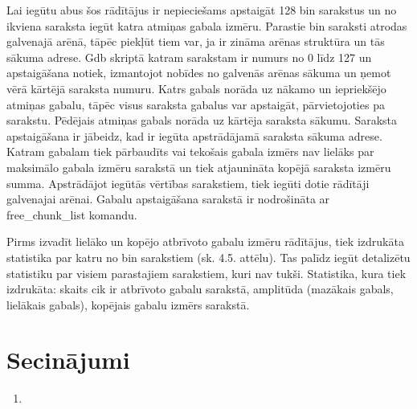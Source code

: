 Lai iegūtu abus šos rādītājus ir nepieciešams apstaigāt 128 bin sarakstus un no ikviena saraksta iegūt katra atmiņas gabala izmēru.
Parastie bin saraksti atrodas galvenajā arēnā, tāpēc piekļūt tiem var, ja ir zināma arēnas struktūra un tās sākuma adrese.
Gdb skriptā katram sarakstam ir numurs no 0 līdz 127 un apstaigāšana notiek, izmantojot nobīdes no galvenās arēnas sākuma un ņemot vērā kārtējā saraksta numuru.
Katrs gabals norāda uz nākamo un iepriekšējo atmiņas gabalu, tāpēc visus saraksta gabalus var apstaigāt, pārvietojoties pa sarakstu.
Pēdējais atmiņas gabals norāda uz kārtēja saraksta sākumu.
Saraksta apstaigāšana ir jābeidz, kad ir iegūta apstrādājamā saraksta sākuma adrese.
Katram gabalam tiek pārbaudīts vai tekošais gabala izmērs nav lielāks par maksimālo gabala izmēru sarakstā un tiek atjaunināta kopējā saraksta izmēru summa.
Apstrādājot iegūtās vērtības sarakstiem, tiek iegūti dotie rādītāji galvenajai arēnai.
Gabalu apstaigāšana sarakstā ir nodrošināta ar free\_chunk\_list komandu.

Pirms izvadīt lielāko un kopējo atbrīvoto gabalu izmēru rādītājus, tiek izdrukāta statistika par katru no bin sarakstiem (sk. 4.5. attēlu).
Tas palīdz iegūt detalizētu statistiku par visiem parastajiem sarakstiem, kuri nav tukši.
Statistika, kura tiek izdrukāta: skaits cik ir atbrīvoto gabalu sarakstā, amplitūda (mazākais gabals, lielākais gabals), kopējais gabalu izmērs sarakstā.


\section{Secinājumi}
\begin{enumerate}
\item
\end{enumerate}


